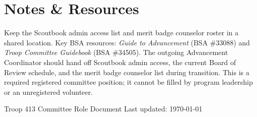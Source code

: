 \documentclass[11pt, letterpaper]{article}
\begin{document}
\vspace{0.6em}

\section{Notes \& Resources}
Keep the Scoutbook admin access list and merit badge counselor roster in a shared location. Key BSA resources: \textit{Guide to Advancement} (BSA \#33088) and \textit{Troop Committee Guidebook} (BSA \#34505). The outgoing Advancement Coordinator should hand off Scoutbook admin access, the current Board of Review schedule, and the merit badge counselor list during transition. This is a required registered committee position; it cannot be filled by program leadership or an unregistered volunteer.

\vfill
\begin{center}
  \footnotesize\color{gray}
  Troop 413 \textbullet{} Committee Role Document \textbullet{} Last updated: \today
\end{center}
\end{document}
